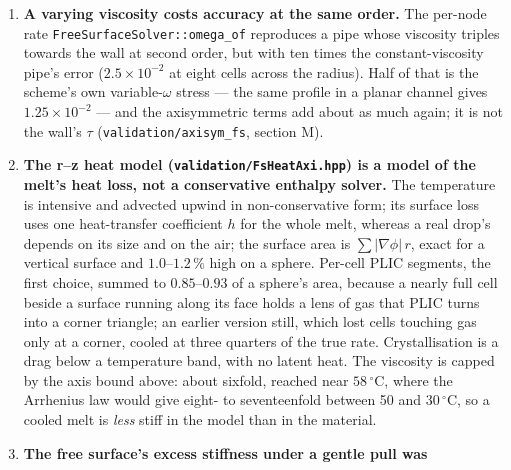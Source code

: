 \documentclass[11pt,a4paper]{article}
\newcommand{\code}[1]{\texttt{\small #1}}
\begin{document}
\begin{enumerate}[leftmargin=1.4em,itemsep=4pt]
  remains are explicit first-derivative terms whose coefficient $\mu/r$ is a
  speed in cells per step near the axis. So $\nu\lesssim1$, and
  $\nu\le1/2$ is clean (\code{validation/axisym\_fs}, section T). In a
  capillary scaling the time step does not depend on $\nu$, so the bound costs
  range rather than time, but a melt whose viscosity follows its temperature
  can rise at most about sixfold from $\nu=1/6$. And $\nu$ is not free in
  the answer: \code{mew\_axi}'s column touches the collector at $15.448$,
  $15.691$ and $15.803$\,s at $\nu=1/2$, $1/4$ and $1/6$, a quadratic through
  which gives $16.07$\,s as $\nu\to0$ --- a $1.7\,\%$ error at the default,
  from the walls and the free surface at $\tau\neq1/2$.
\item \textbf{A varying viscosity costs accuracy at the same order.} The
  per-node rate \code{FreeSurfaceSolver::omega\_of} reproduces a pipe whose
  viscosity triples towards the wall at second order, but with ten times the
  constant-viscosity pipe's error ($2.5\times10^{-2}$ at eight cells across the
  radius). Half of that is the scheme's own variable-$\omega$ stress --- the
  same profile in a planar channel gives $1.25\times10^{-2}$ --- and the
  axisymmetric terms add about as much again; it is not the wall's $\tau$
  (\code{validation/axisym\_fs}, section M).
\item \textbf{The r--z heat model (\code{validation/FsHeatAxi.hpp}) is a
  model of the melt's heat loss, not a conservative enthalpy solver.} The
  temperature is intensive and advected upwind in non-conservative form; its
  surface loss uses one heat-transfer coefficient $h$ for the whole melt,
  whereas a real drop's depends on its size and on the air; the surface area is
  $\sum|\nabla\phi|\,r$, exact for a vertical surface and $1.0$--$1.2\,\%$
  high on a sphere. Per-cell PLIC segments, the first choice, summed to
  $0.85$--$0.93$ of a sphere's area, because a nearly full cell beside a surface
  running along its face holds a lens of gas that PLIC turns into a corner
  triangle; an earlier version still, which lost cells touching gas only at a
  corner, cooled at three quarters of the true rate. Crystallisation is a drag
  below a temperature band, with no latent heat. The viscosity is capped by the
  axis bound above: about sixfold, reached near $58\,^\circ$C, where the
  Arrhenius law would give eight- to seventeenfold between 50 and $30\,^\circ$C,
  so a cooled melt is \emph{less} stiff in the model than in the material.
\item \textbf{The free surface's excess stiffness under a gentle pull was
}
\end{enumerate}
\end{document}

